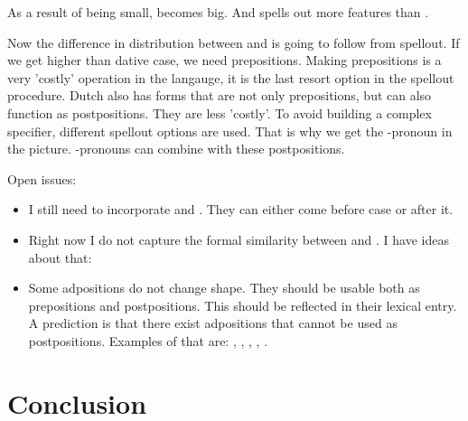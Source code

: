 \documentclass{article}
\begin{document}
As a result of  being small,  becomes big. And  spells out more features than .

Now the difference in distribution between  and  is going to follow from spellout. If we get higher than dative case, we need prepositions. Making prepositions is a very 'costly' operation in the langauge, it is the last resort option in the spellout procedure. Dutch also has forms that are not only prepositions, but can also function as postpositions. They are less 'costly'. To avoid building a complex specifier, different spellout options are used. That is why we get the -pronoun in the picture. -pronouns can combine with these postpositions.



Open issues:

\begin{itemize}
  \item I still need to incorporate  and . They can either come before case or after it.
  \item Right now I do not capture the formal similarity between  and . I have ideas about that:
  \item Some adpositions do not change shape. They should be usable both as prepositions and postpositions. This should be reflected in their lexical entry. A prediction is that there exist adpositions that cannot be used as postpositions. Examples of that are: , , , , .
\end{itemize}

\section{Conclusion}

\printbibliography
\end{document}
